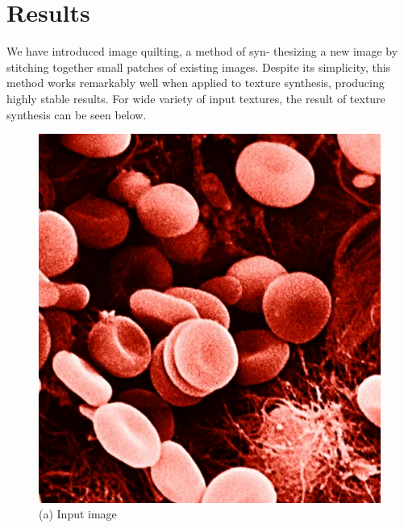 \documentclass[12pt,a4paper]{report}
\begin{document}
\section{Results}
We have introduced image quilting, a method of syn-
thesizing a new image by stitching together small patches of existing images. Despite its simplicity, this method works remarkably well when applied to texture synthesis, producing highly stable results. For wide variety of input textures, the result of texture synthesis can be seen below.
\newline
\begin{figure}[H]
  \centering
  \centering
  \includegraphics[scale=0.22]{pics/rbc_input.jpg}
  \caption*{(a) Input image}
  \endminipage
  \centering

\end{figure}
\end{document}
